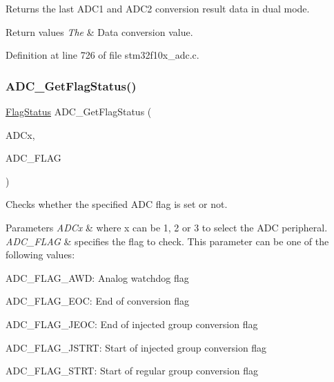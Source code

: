 Returns the last A\+D\+C1 and A\+D\+C2 conversion result data in dual mode. 


\begin{DoxyRetVals}{Return values}
{\em The} & Data conversion value. \\
\hline
\end{DoxyRetVals}


Definition at line 726 of file stm32f10x\+\_\+adc.\+c.

\mbox{\label{group___a_d_c___exported___functions_gaa12546e51ec905c90a3aada432bd4633}} 
\subsubsection{\texorpdfstring{A\+D\+C\+\_\+\+Get\+Flag\+Status()}{ADC\_GetFlagStatus()}}
{\footnotesize\ttfamily \hyperlink{group___exported__types_ga89136caac2e14c55151f527ac02daaff}{Flag\+Status} A\+D\+C\+\_\+\+Get\+Flag\+Status (\begin{DoxyParamCaption}\item[{\hyperlink{struct_a_d_c___type_def}{A\+D\+C\+\_\+\+Type\+Def} $\ast$}]{A\+D\+Cx,  }\item[{uint8\+\_\+t}]{A\+D\+C\+\_\+\+F\+L\+AG }\end{DoxyParamCaption})}



Checks whether the specified A\+DC flag is set or not. 


\begin{DoxyParams}{Parameters}
{\em A\+D\+Cx} & where x can be 1, 2 or 3 to select the A\+DC peripheral. \\
\hline
{\em A\+D\+C\+\_\+\+F\+L\+AG} & specifies the flag to check. This parameter can be one of the following values\+: \begin{DoxyItemize}
\item A\+D\+C\+\_\+\+F\+L\+A\+G\+\_\+\+A\+WD\+: Analog watchdog flag \item A\+D\+C\+\_\+\+F\+L\+A\+G\+\_\+\+E\+OC\+: End of conversion flag \item A\+D\+C\+\_\+\+F\+L\+A\+G\+\_\+\+J\+E\+OC\+: End of injected group conversion flag \item A\+D\+C\+\_\+\+F\+L\+A\+G\+\_\+\+J\+S\+T\+RT\+: Start of injected group conversion flag \item A\+D\+C\+\_\+\+F\+L\+A\+G\+\_\+\+S\+T\+RT\+: Start of regular group conversion flag \end{DoxyItemize}
\\
\hline
\end{DoxyParams}

